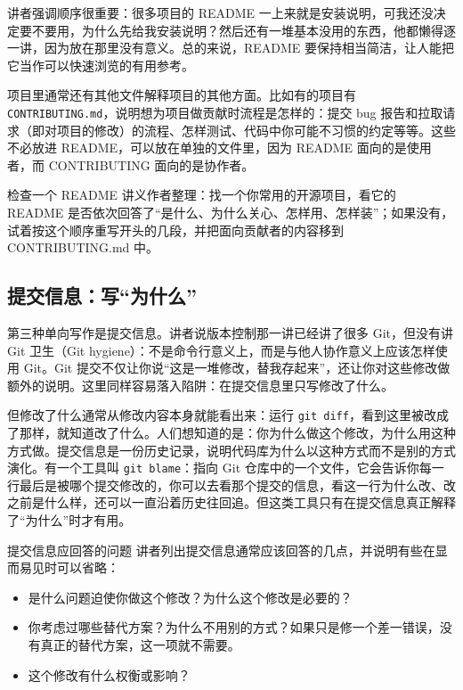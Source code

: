 \documentclass[a4paper]{article}
\begin{document}
讲者强调顺序很重要：很多项目的 README 一上来就是安装说明，可我还没决定要不要用，为什么先给我安装说明？然后还有一堆基本没用的东西，他都懒得逐一讲，因为放在那里没有意义。总的来说，README 要保持相当简洁，让人能把它当作可以快速浏览的有用参考。

项目里通常还有其他文件解释项目的其他方面。比如有的项目有 \texttt{CONTRIBUTING.md}，说明想为项目做贡献时流程是怎样的：提交 bug 报告和拉取请求（即对项目的修改）的流程、怎样测试、代码中你可能不习惯的约定等等。这些不必放进 README，可以放在单独的文件里，因为 README 面向的是使用者，而 CONTRIBUTING 面向的是协作者。

\begin{practicebox}{检查一个 README}
讲义作者整理：找一个你常用的开源项目，看它的 README 是否依次回答了“是什么、为什么关心、怎样用、怎样装”；如果没有，试着按这个顺序重写开头的几段，并把面向贡献者的内容移到 CONTRIBUTING.md 中。
\end{practicebox}

\subsection{提交信息：写“为什么”}

第三种单向写作是提交信息。讲者说版本控制那一讲已经讲了很多 Git，但没有讲 Git 卫生（Git hygiene）：不是命令行意义上，而是与他人协作意义上应该怎样使用 Git。Git 提交不仅让你说“这是一堆修改，替我存起来”，还让你对这些修改做额外的说明。这里同样容易落入陷阱：在提交信息里只写修改了什么。

但修改了什么通常从修改内容本身就能看出来：运行 \texttt{git diff}，看到这里被改成了那样，就知道改了什么。人们想知道的是：你为什么做这个修改，为什么用这种方式做。提交信息是一份历史记录，说明代码库为什么以这种方式而不是别的方式演化。有一个工具叫 \texttt{git blame}：指向 Git 仓库中的一个文件，它会告诉你每一行最后是被哪个提交修改的，你可以去看那个提交的信息，看这一行为什么改、改之前是什么样，还可以一直沿着历史往回追。但这类工具只有在提交信息真正解释了“为什么”时才有用。

\begin{importantbox}{提交信息应回答的问题}
讲者列出提交信息通常应该回答的几点，并说明有些在显而易见时可以省略：
\begin{itemize}
\item 是什么问题迫使你做这个修改？为什么这个修改是必要的？
\item 你考虑过哪些替代方案？为什么不用别的方式？如果只是修一个差一错误，没有真正的替代方案，这一项就不需要。
\item 这个修改有什么权衡或影响？
\end{itemize}
\end{importantbox}
\end{document}
